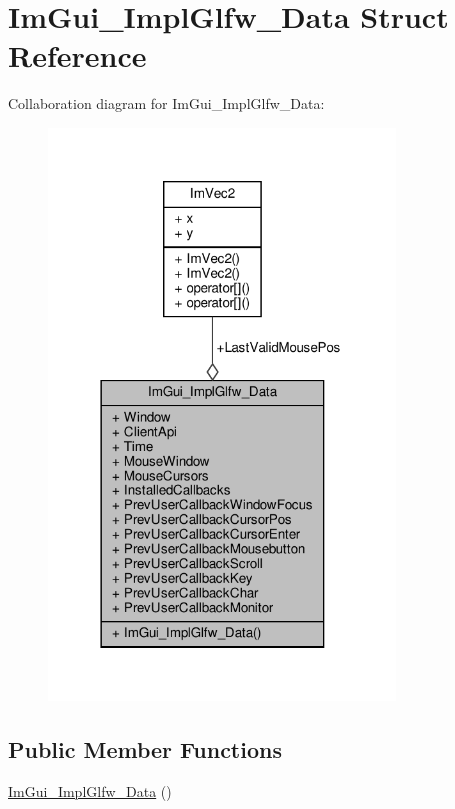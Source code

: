 \hypertarget{structImGui__ImplGlfw__Data}{}\section{Im\+Gui\+\_\+\+Impl\+Glfw\+\_\+\+Data Struct Reference}
\label{structImGui__ImplGlfw__Data}


Collaboration diagram for Im\+Gui\+\_\+\+Impl\+Glfw\+\_\+\+Data\+:
\nopagebreak
\begin{figure}[H]
\begin{center}
\leavevmode
\includegraphics[width=261pt]{structImGui__ImplGlfw__Data__coll__graph}
\end{center}
\end{figure}
\subsection*{Public Member Functions}
\begin{DoxyCompactItemize}
\item 
\hyperlink{structImGui__ImplGlfw__Data_ae3a69538a90536f112b99b968d385be7}{Im\+Gui\+\_\+\+Impl\+Glfw\+\_\+\+Data} ()
\end{DoxyCompactItemize}
